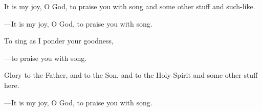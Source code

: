 \responsory
\begin{hangpar}

It is my joy, O God, to praise you with song and some other stuff and such-like.

{\color{red}---\thinspace}It is my joy, O God, to praise you with song.

\medskip To sing as I ponder your goodness,

{\color{red}---\thinspace}to praise you with song.

\medskip Glory to the Father, and to the Son, and to the Holy Spirit and some other stuff here.

{\color{red}---\thinspace}It is my joy, O God, to praise you with song.

\end{hangpar}
